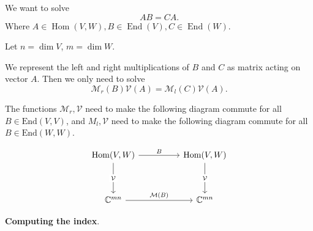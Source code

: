 

We want to solve
\[
	A B = C A
.\] 
Where $A \in \operatorname{Hom}(V, W), B \in \operatorname{End}(V), C \in \operatorname{End}(W)$.

Let $n = \operatorname{dim} V$, $m = \operatorname{dim} W$.

We represent the left and right multiplications of $B$ and $C$ as matrix acting on vector $A$. Then we only need to solve
\[
	\mathcal{M}_r(B) \mathcal{V}(A) = \mathcal{M}_l (C) \mathcal{V}(A)
.\] 

The functions $\mathcal{M}_r, \mathcal{V}$ need to make the following diagram commute for all $B \in \text{End}(V, V)$, and $M_l, \mathcal{V}$ need to make the following diagram commute for all $B \in \text{End}(W, W)$.

\[\begin{tikzcd}
	{\operatorname{Hom}(V, W)} && {\operatorname{Hom}(V, W)} \\
	\\
	{\mathbb{C}^{m n}} && {\mathbb{C}^{m n}}
	\arrow["{\mathcal{M}(B)}", from=3-1, to=3-3]
	\arrow["B", from=1-1, to=1-3]
	\arrow["{\mathcal{V}}"{description}, from=1-1, to=3-1]
	\arrow["{\mathcal{V}}"{description}, from=1-3, to=3-3]
\end{tikzcd}\]

\textbf{Computing the index}. 

